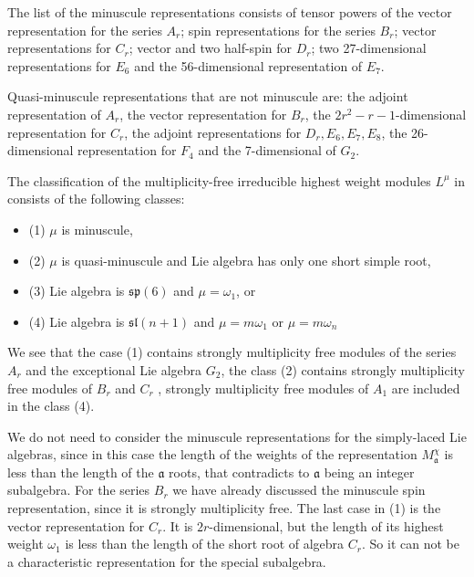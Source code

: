\documentclass[12pt]{article}
\newcommand{\af}{\mathfrak{a}}
\begin{document}
The list of the minuscule representations consists of tensor powers of the vector
representation for the series $A_{r}$; spin representations for the series
$B_{r}$; vector representations for $C_{r}$; vector and two half-spin for $D_{r}$; two
27-dimensional representations for $E_{6}$ and the 56-dimensional representation of $E_{7}$. 

Quasi-minuscule representations that are not minuscule are: the adjoint representation of $A_{r}$,
the vector representation for $B_{r}$, the $2r^{2}-r-1$-dimensional representation for $C_{r}$, the adjoint
representations for $D_{r}, E_{6}, E_{7}, E_{8}$, the 26-dimensional representation for $F_{4}$ and
the 7-dimensional of $G_{2}$.


The classification of the multiplicity-free irreducible highest weight modules $L^{\mu}$ in
\cite{howe1995perspectives,stembridge2003multiplicity} consists of the following classes:
\begin{itemize}
\item (1) $\mu$ is minuscule,
\item (2) $\mu$ is quasi-minuscule and Lie algebra has only one short simple root,
\item (3) Lie algebra is $\mathfrak{sp}(6)$ and $\mu=\omega_{1}$, or
\item (4) Lie algebra is $\mathfrak{sl}(n + 1)$ and  $\mu= m\omega_{1}$ or $\mu  = m\omega_{n}$ 
\end{itemize}

We see that the case (1) contains strongly multiplicity free modules of the series $A_{r}$ and the exceptional
Lie algebra $G_{2}$, the class (2) contains strongly multiplicity free modules of $ B_{r}$ and $C_{r}$ ,
strongly multiplicity free modules of $A_{1}$ are included in the class (4).

We do not need to consider the minuscule representations for the simply-laced Lie algebras, since in this
case the length of the weights of the representation $M^{\chi}_{\af}$ is less than the length of the $\af$ roots,
that contradicts to $\af$ being an integer subalgebra. For the series $B_{r}$ we have already
discussed the minuscule spin representation, since it is strongly multiplicity free. The last case in
(1) is the vector representation for $C_{r}$. It is $2r$-dimensional, but the length of its highest weight $\omega_{1}$ is less
than the length of the short root of algebra $C_{r}$. So it can not be a characteristic representation
for the special subalgebra. 
\end{document}
